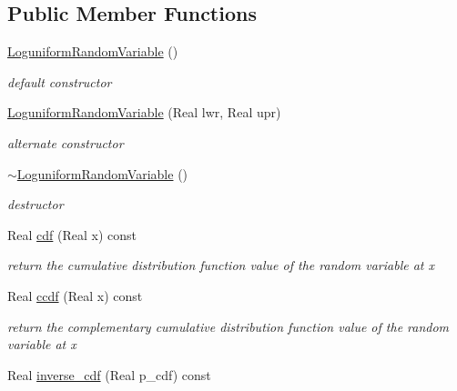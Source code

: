 \subsection*{Public Member Functions}
\begin{DoxyCompactItemize}
\item 
\hyperlink{classPecos_1_1LoguniformRandomVariable_a2a04989ce29e747860c267f08dec5b0d}{Loguniform\+Random\+Variable} ()\label{classPecos_1_1LoguniformRandomVariable_a2a04989ce29e747860c267f08dec5b0d}

\begin{DoxyCompactList}\small\item\em default constructor \end{DoxyCompactList}\item 
\hyperlink{classPecos_1_1LoguniformRandomVariable_af2c7e96e0f689a9061ab515206e09cfd}{Loguniform\+Random\+Variable} (Real lwr, Real upr)\label{classPecos_1_1LoguniformRandomVariable_af2c7e96e0f689a9061ab515206e09cfd}

\begin{DoxyCompactList}\small\item\em alternate constructor \end{DoxyCompactList}\item 
\hyperlink{classPecos_1_1LoguniformRandomVariable_a87d670be59e313e45b381b6882e40be9}{$\sim$\+Loguniform\+Random\+Variable} ()\label{classPecos_1_1LoguniformRandomVariable_a87d670be59e313e45b381b6882e40be9}

\begin{DoxyCompactList}\small\item\em destructor \end{DoxyCompactList}\item 
Real \hyperlink{classPecos_1_1LoguniformRandomVariable_addd564e7f4f314e12d38df74d845f0d8}{cdf} (Real x) const \label{classPecos_1_1LoguniformRandomVariable_addd564e7f4f314e12d38df74d845f0d8}

\begin{DoxyCompactList}\small\item\em return the cumulative distribution function value of the random variable at x \end{DoxyCompactList}\item 
Real \hyperlink{classPecos_1_1LoguniformRandomVariable_a23c3b599e7e4788a9a5e9e93c3dbaf4d}{ccdf} (Real x) const \label{classPecos_1_1LoguniformRandomVariable_a23c3b599e7e4788a9a5e9e93c3dbaf4d}

\begin{DoxyCompactList}\small\item\em return the complementary cumulative distribution function value of the random variable at x \end{DoxyCompactList}\item 
Real \hyperlink{classPecos_1_1LoguniformRandomVariable_a918a1aac05ca349ea5313eebcba46c3e}{inverse\+\_\+cdf} (Real p\+\_\+cdf) const \label{classPecos_1_1LoguniformRandomVariable_a918a1aac05ca349ea5313eebcba46c3e}


\end{DoxyCompactItemize}
